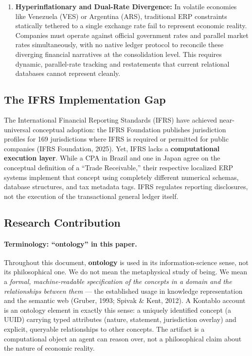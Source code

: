 \begin{enumerate}
    \item \textbf{Hyperinflationary and Dual-Rate Divergence:} In volatile economies like Venezuela (VES) or Argentina (ARS), traditional ERP constraints statically tethered to a single exchange rate fail to represent economic reality. Companies must operate against official government rates and parallel market rates simultaneously, with no native ledger protocol to reconcile these diverging financial narratives at the consolidation level. This requires dynamic, parallel-rate tracking and restatements that current relational databases cannot represent cleanly.
\end{enumerate}

\subsection{The IFRS Implementation Gap}
The International Financial Reporting Standards (IFRS) have achieved near-universal conceptual adoption: the IFRS Foundation publishes jurisdiction profiles for 169 jurisdictions where IFRS is required or permitted for public companies (IFRS Foundation, 2025). Yet, IFRS lacks a \textbf{computational execution layer}. While a CPA in Brazil and one in Japan agree on the conceptual definition of a ``Trade Receivable,'' their respective localized ERP systems implement that concept using completely different numerical schemas, database structures, and tax metadata tags. IFRS regulates reporting disclosures, not the execution of the transactional general ledger itself.

\subsection{Research Contribution}

\paragraph{Terminology: ``ontology'' in this paper.} Throughout this document,
\textbf{ontology} is used in its information-science sense, not its
philosophical one. We do not mean the metaphysical study of being. We mean a
\emph{formal, machine-readable specification of the concepts in a domain and
the relationships between them} --- the established usage in knowledge
representation and the semantic web (Gruber, 1993; Spivak \& Kent, 2012). A
Kontablo account is an ontology element in exactly this sense: a uniquely
identified concept (a UUID) carrying typed attributes (nature, statement,
jurisdiction overlay) and explicit, queryable relationships to other concepts.
The artifact is a computational object an agent can reason over, not a
philosophical claim about the nature of economic reality.

